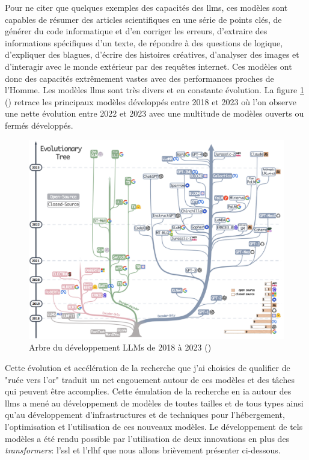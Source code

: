 Pour ne citer que quelques exemples des capacités des \gls{llms}, ces modèles sont capables de résumer des articles scientifiques en une série de points clés, de générer du code informatique et d'en corriger les erreurs, d'extraire des informations spécifiques d'un texte, de répondre à des questions de logique, d'expliquer des blagues, d'écrire des histoires créatives, d'analyser des images et d'interagir avec le monde extérieur par des requêtes internet. Ces modèles ont donc des capacités extrêmement vastes avec des performances proches de l'Homme. Les modèles \gls{llms} sont très divers et en constante évolution. La figure \ref{fig:llm-tree} (\cite{yang_harnessing_2023}) retrace les principaux modèles développés entre 2018 et 2023 où l'on observe une nette évolution entre 2022 et 2023 avec une multitude de modèles ouverts ou fermés développés. 
\begin{figure}[!ht]
 \centering
 \includegraphics[width=1\textwidth]{figures/llm_tree.png}
 \caption[Arbre du développement LLMs de 2018 à 2023 (\cite{yang_harnessing_2023})]{Arbre du développement LLMs de 2018 à 2023 (\cite{yang_harnessing_2023})}
 \label{fig:llm-tree}
\end{figure}
Cette évolution et accélération de la recherche que j'ai choisies de qualifier de "ruée vers l'or" traduit un net engouement autour de ces modèles et des tâches qui peuvent être accomplies. Cette émulation de la recherche en \gls{ia} autour des \gls{llms} a mené au développement de modèles de toutes tailles et de tous types ainsi qu'au développement d'infrastructures et de techniques pour l'hébergement, l'optimisation et l'utilisation de ces nouveaux modèles. Le développement de tels modèles a été rendu possible par l'utilisation de deux innovations en plus des \textit{transformers}: l'\gls{ssl} et l'\gls{rlhf} que nous allons brièvement présenter ci-dessous.


